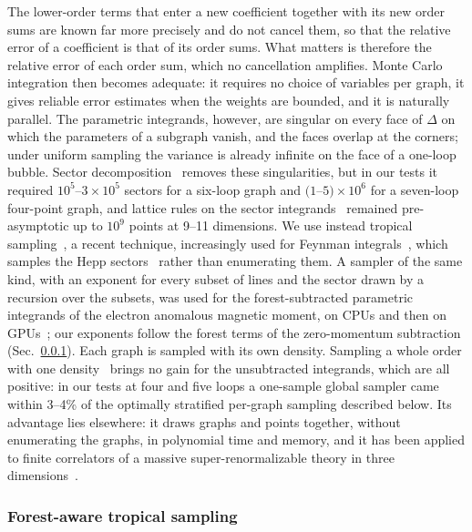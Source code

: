 The lower-order terms that enter a new coefficient together with its new order sums are known far more precisely
and do not cancel them, so that the relative error of a coefficient is that of its order sums. What matters is therefore the relative error of each order sum, which no
cancellation amplifies. Monte Carlo integration then becomes adequate: it requires no choice of variables per
graph, it gives reliable error estimates when the weights are bounded, and it is naturally parallel. The parametric
integrands, however, are singular on every face of $\Delta$ on which the parameters of a subgraph vanish, and the faces
overlap at the corners; under uniform sampling the variance is already infinite on the face of a one-loop bubble. Sector
decomposition~\cite{BinothHeinrich2000,pySecDec2018} removes these singularities, but in our tests it required $10^5$--$3\times10^5$ sectors for a six-loop
graph and $(1$--$5)\times10^6$ for a seven-loop four-point graph, and lattice rules on the sector
integrands~\cite{pySecDecQMC2019} remained pre-asymptotic up to $10^9$ points at 9--11 dimensions. We use instead
tropical sampling~\cite{Borinsky2023tropical,feyntrop2024}, a recent technique, increasingly used for Feynman
integrals~\cite{Balduf2023,feyntrop2024,Borinsky2025global}, which samples the Hepp sectors~\cite{Hepp1966} rather
than enumerating them. A sampler of the same
kind, with an exponent for every subset of lines and the sector drawn by a recursion over the subsets, was used
for the forest-subtracted parametric integrands of the electron anomalous magnetic moment, on CPUs and then on
GPUs~\cite{Volkov2017,Volkov2018,Volkov2024}; our exponents follow the forest terms of the zero-momentum subtraction
(Sec.~\ref{sec:methods-tropical}). Each graph is sampled with its own density. Sampling a whole order with one
density~\cite{Borinsky2025global} brings no gain for the unsubtracted integrands, which are all positive: in our tests at
four and five loops a one-sample global sampler came within 3--4\% of the optimally stratified per-graph sampling
described below. Its advantage lies elsewhere: it draws graphs and points together, without enumerating the graphs, in
polynomial time and memory, and it has been applied to finite correlators of a massive super-renormalizable theory in
three dimensions~\cite{Borinsky2025global}.

\subsubsection{Forest-aware tropical sampling}
\label{sec:methods-tropical}

